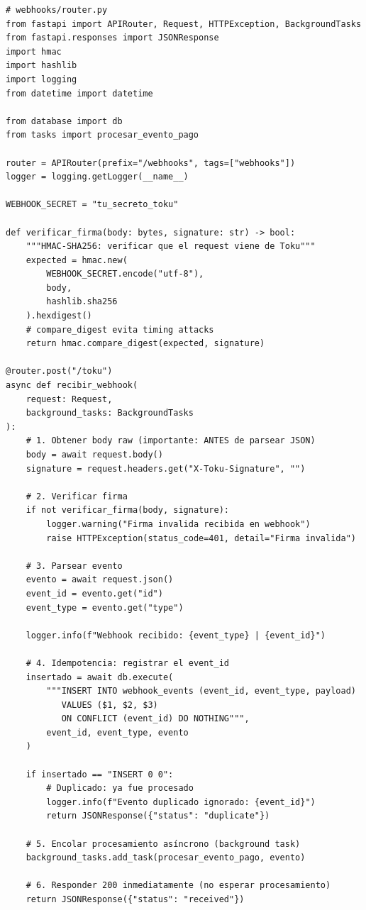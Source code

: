 \documentclass[11pt,a4paper]{article}
\begin{document}
\begin{lstlisting}[style=python]
# webhooks/router.py
from fastapi import APIRouter, Request, HTTPException, BackgroundTasks
from fastapi.responses import JSONResponse
import hmac
import hashlib
import logging
from datetime import datetime

from database import db
from tasks import procesar_evento_pago

router = APIRouter(prefix="/webhooks", tags=["webhooks"])
logger = logging.getLogger(__name__)

WEBHOOK_SECRET = "tu_secreto_toku"

def verificar_firma(body: bytes, signature: str) -> bool:
    """HMAC-SHA256: verificar que el request viene de Toku"""
    expected = hmac.new(
        WEBHOOK_SECRET.encode("utf-8"),
        body,
        hashlib.sha256
    ).hexdigest()
    # compare_digest evita timing attacks
    return hmac.compare_digest(expected, signature)

@router.post("/toku")
async def recibir_webhook(
    request: Request,
    background_tasks: BackgroundTasks
):
    # 1. Obtener body raw (importante: ANTES de parsear JSON)
    body = await request.body()
    signature = request.headers.get("X-Toku-Signature", "")

    # 2. Verificar firma
    if not verificar_firma(body, signature):
        logger.warning("Firma invalida recibida en webhook")
        raise HTTPException(status_code=401, detail="Firma invalida")

    # 3. Parsear evento
    evento = await request.json()
    event_id = evento.get("id")
    event_type = evento.get("type")

    logger.info(f"Webhook recibido: {event_type} | {event_id}")

    # 4. Idempotencia: registrar el event_id
    insertado = await db.execute(
        """INSERT INTO webhook_events (event_id, event_type, payload)
           VALUES ($1, $2, $3)
           ON CONFLICT (event_id) DO NOTHING""",
        event_id, event_type, evento
    )

    if insertado == "INSERT 0 0":
        # Duplicado: ya fue procesado
        logger.info(f"Evento duplicado ignorado: {event_id}")
        return JSONResponse({"status": "duplicate"})

    # 5. Encolar procesamiento asíncrono (background task)
    background_tasks.add_task(procesar_evento_pago, evento)

    # 6. Responder 200 inmediatamente (no esperar procesamiento)
    return JSONResponse({"status": "received"})
\end{lstlisting}
\end{document}

